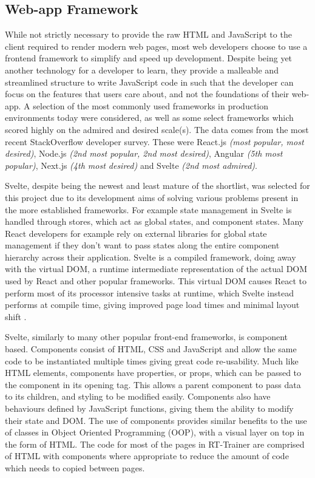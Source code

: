 \subsection{Web-app Framework}
\label{sse:webappframework}
While not strictly necessary to provide the raw HTML and JavaScript to the client required to render modern web pages, most web developers choose to use a frontend framework to simplify and speed up development. Despite being yet another technology for a developer to learn, they provide a malleable and streamlined structure to write JavaScript code in such that the developer can focus on the features that users care about, and not the foundations of their web-app. A selection of the most commonly used frameworks in production environments today were considered, as well as some select frameworks which scored highly on the admired and desired scale(s). The data comes from the most recent StackOverflow developer survey. These were React.js \textit{(most popular, most desired)}, Node.js \textit{(2nd most popular, 2nd most desired)}, Angular \textit{(5th most popular)}, Next.js \textit{(4th most desired)} and Svelte \textit{(2nd most admired)}\cite{StackOverflow2023Survey}.

Svelte, despite being the newest and least mature of the shortlist, was selected for this project due to its development aims of solving various problems present in the more established frameworks. For example state management in Svelte is handled through stores, which act as global states, and component states. Many React developers for example rely on external libraries for global state management if they don't want to pass states along the entire component hierarchy across their application. Svelte is a compiled framework, doing away with the virtual DOM, a runtime intermediate representation of the actual DOM used by React and other popular frameworks. This virtual DOM causes React to perform most of its processor intensive tasks at runtime, which Svelte instead performs at compile time, giving improved page load times and minimal layout shift \cite{virtual-dom-overhead}.

Svelte, similarly to many other popular front-end frameworks, is component based. Components consist of HTML, CSS and JavaScript and allow the same code to be instantiated multiple times giving great code re-usability. Much like HTML elements, components have properties, or props, which can be passed to the component in its opening tag. This allows a parent component to pass data to its children, and styling to be modified easily. Components also have behaviours defined by JavaScript functions, giving them the ability to modify their state and DOM. The use of components provides similar benefits to the use of classes in Object Oriented Programming (OOP), with a visual layer on top in the form of HTML. The code for most of the pages in RT-Trainer are comprised of HTML with components where appropriate to reduce the amount of code which needs to copied between pages.

